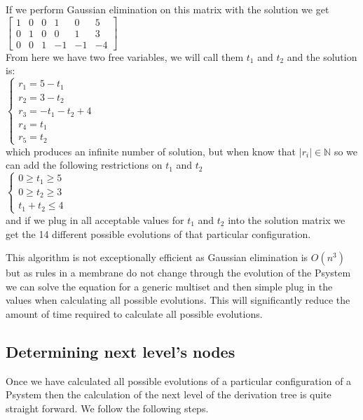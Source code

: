 \documentclass[runningheads]{llncs}
\begin{document}
If we perform Gaussian elimination on this matrix with the solution we get \\[3ex]
$ \begin{bmatrix} 1 & 0 & 0 & 1 & 0 & 5 \\ 0 & 1 & 0 & 0 & 1 & 3 \\ 0 & 0 & 1 & -1 & -1 & -4 \end{bmatrix} $ \\[3ex]
From here we have two free variables, we will call them $t_1$ and $t_2$ and the solution is: \\[3ex] 
$ \begin{cases}  r_1 = 5 - t_1 \\  r_2 = 3- t_2 \\  r_3 = -t_1 -t_2 + 4   \\  r_4 = t_1 \\  r_5 = t_2 \end{cases} $ \\[3ex]
which produces an infinite number of solution, but when know that $|r_i| \in \mathbb{N}$ so we can add the following restrictions on $t_1$ and $t_2$ \\[3ex]
$ \begin{cases}  0 \geq t_1 \geq 5  \\  0 \geq t_2 \geq 3  \\  t_1 + t_2 \leq 4  \end{cases} $ \\

and if we plug in all acceptable values for $t_1$ and $t_2$ into the solution matrix we get the 14 different possible evolutions of that particular configuration.

This algorithm is not exceptionally efficient as Gaussian elimination is $O(n^3)$ but as rules in a membrane do not change through the evolution of the Psystem we can solve the equation for a generic multiset and then simple plug in the values when calculating all possible evolutions. This will significantly reduce the amount of time required to calculate all possible evolutions. 

\subsection{Determining next level's nodes }

Once we have calculated all possible evolutions of a particular configuration of a Psystem then the calculation of the next level of the derivation tree is quite straight forward. We follow the following steps.
\end{document}
